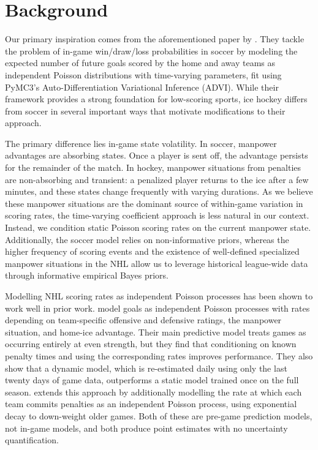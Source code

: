 \documentclass{article}
\begin{document}
\section{Background}
Our primary inspiration comes from the aforementioned paper by \citet{robberechts2021bayesian}. They tackle the problem of in-game win/draw/loss probabilities in soccer by modeling the expected number of future goals scored by the home and away teams as independent Poisson distributions with time-varying parameters, fit using PyMC3's Auto-Differentiation Variational Inference (ADVI). While their framework provides a strong foundation for low-scoring sports, ice hockey differs from soccer in several important ways that motivate modifications to their approach.


The primary difference lies in-game state volatility. In soccer, manpower advantages are absorbing states. Once a player is sent off, the advantage persists for the remainder of the match. In hockey, manpower situations from penalties are non-absorbing and transient: a penalized player returns to the ice after a few minutes, and these states change frequently with varying durations. As we believe these manpower situations are the dominant source of within-game variation in scoring rates, the time-varying coefficient approach is less natural in our context. Instead, we condition static Poisson scoring rates on the current manpower state. Additionally, the soccer model relies on non-informative priors, whereas the higher frequency of scoring events and the existence of well-defined specialized manpower situations in the NHL allow us to leverage historical league-wide data through informative empirical Bayes priors.


Modelling NHL scoring rates as independent Poisson processes has been shown to work well in prior work. \citet{buttrey2011estimating} model goals as independent Poisson processes with rates depending on team-specific offensive and defensive ratings, the manpower situation, and home-ice advantage. Their main predictive model treats games as occurring entirely at even strength, but they find that conditioning on known penalty times and using the corresponding rates improves performance. They also show that a dynamic model, which is re-estimated daily using only the last twenty days of game data, outperforms a static model trained once on the full season. \citet{buttrey2016predicting} extends this approach by additionally modelling the rate at which each team commits penalties as an independent Poisson process, using exponential decay to down-weight older games. Both of these are pre-game prediction models, not in-game models, and both produce point estimates with no uncertainty quantification.
\end{document}
